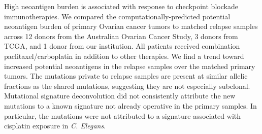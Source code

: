 High neoantigen burden is associated with response to checkpoint blockade immunotherapies. We compared the computationally-predicted potential neoantigen burden of primary Ovarian cancer tumors to matched relapse samples across 12 donors from the Australian Ovarian Cancer Study, 3 donors from TCGA, and 1 donor from our institution. All patients received combination paclitaxel/carboplatin in addition to other therapies. We find a trend toward increased potential neoantigens in the relapse samples over the matched primary tumors. The mutations private to relapse samples are present at similar allelic fractions as the shared mutations, suggesting they are not especially subclonal. Mutational signature deconvolution did not consistently attribute the new mutations to a known signature not already operative in the primary samples. In particular, the mutations were not attributed to a signature associated with cisplatin exposure in \textit{C. Elegans}.

